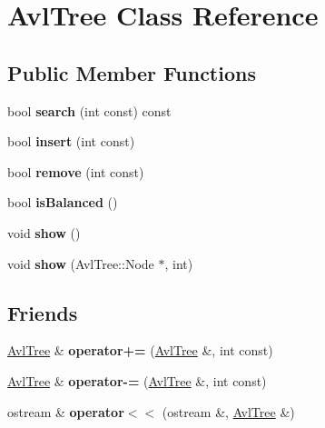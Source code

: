\hypertarget{class_avl_tree}{}\section{Avl\+Tree Class Reference}
\label{class_avl_tree}
\subsection*{Public Member Functions}
\begin{DoxyCompactItemize}
\item 
\mbox{\label{class_avl_tree_a62f478c45b1505e637617a5a8edb9374}} 
bool {\bfseries search} (int const) const
\item 
\mbox{\label{class_avl_tree_a251736611b07cd83fe02f399288fc92e}} 
bool {\bfseries insert} (int const)
\item 
\mbox{\label{class_avl_tree_a9f580161de922fdd2ddb826cc8d8436f}} 
bool {\bfseries remove} (int const)
\item 
\mbox{\label{class_avl_tree_af8f43d1139179e490fffbdd03f7735ac}} 
bool {\bfseries is\+Balanced} ()
\item 
\mbox{\label{class_avl_tree_a0c18b4848eb2a6d5876afb6ea203b7f1}} 
void {\bfseries show} ()
\item 
\mbox{\label{class_avl_tree_ab468a9e24161484f610c4193256d4f00}} 
void {\bfseries show} (Avl\+Tree\+::\+Node $\ast$, int)
\end{DoxyCompactItemize}
\subsection*{Friends}
\begin{DoxyCompactItemize}
\item 
\mbox{\label{class_avl_tree_a7e8543fa39fcd41bf8738b1384658b3f}} 
\mbox{\hyperlink{class_avl_tree}{Avl\+Tree}} \& {\bfseries operator+=} (\mbox{\hyperlink{class_avl_tree}{Avl\+Tree}} \&, int const)
\item 
\mbox{\label{class_avl_tree_aebcb43fe34dc651b0907a6cdeca29946}} 
\mbox{\hyperlink{class_avl_tree}{Avl\+Tree}} \& {\bfseries operator-\/=} (\mbox{\hyperlink{class_avl_tree}{Avl\+Tree}} \&, int const)
\item 
\mbox{\label{class_avl_tree_a294c728291996899d248fb8ea9c9a038}} 
ostream \& {\bfseries operator$<$$<$} (ostream \&, \mbox{\hyperlink{class_avl_tree}{Avl\+Tree}} \&)
\end{DoxyCompactItemize}


